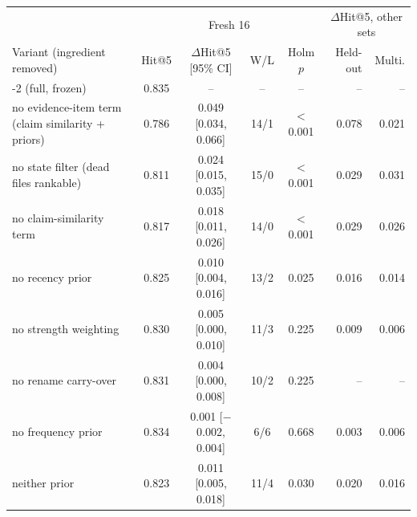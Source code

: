 \begin{tabular}{l@{\hspace{3pt}}ccccrr}
\toprule
 & \multicolumn{4}{c}{Fresh 16} & \multicolumn{2}{c}{$\Delta$Hit@5, other sets} \\
Variant (ingredient removed) & Hit@5 & $\Delta$Hit@5 [95\% CI] & W/L & Holm $p$ & Held-out & Multi. \\
\midrule
\sys{}-2 (full, frozen) & 0.835 & -- & -- & -- & -- & -- \\
\midrule
no evidence-item term (claim similarity + priors) & 0.786 & 0.049 [0.034, 0.066] & 14/1 & $<$0.001 & 0.078 & 0.021 \\
no state filter (dead files rankable) & 0.811 & 0.024 [0.015, 0.035] & 15/0 & $<$0.001 & 0.029 & 0.031 \\
no claim-similarity term & 0.817 & 0.018 [0.011, 0.026] & 14/0 & $<$0.001 & 0.029 & 0.026 \\
no recency prior & 0.825 & 0.010 [0.004, 0.016] & 13/2 & 0.025 & 0.016 & 0.014 \\
no strength weighting & 0.830 & 0.005 [0.000, 0.010] & 11/3 & 0.225 & 0.009 & 0.006 \\
no rename carry-over & 0.831 & 0.004 [0.000, 0.008] & 10/2 & 0.225 & -- & -- \\
no frequency prior & 0.834 & 0.001 [$-$0.002, 0.004] & 6/6 & 0.668 & 0.003 & 0.006 \\
neither prior & 0.823 & 0.011 [0.005, 0.018] & 11/4 & 0.030 & 0.020 & 0.016 \\
\bottomrule
\end{tabular}